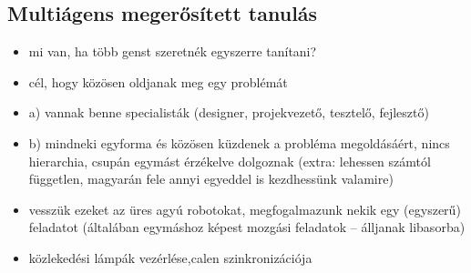 \documentclass[a4paper, 11pt]{article}
\begin{document}
\subsection{Multiágens megerősített tanulás}

\begin{itemize}
	\item mi van, ha több genst szeretnék egyszerre tanítani?
	\item cél, hogy közösen oldjanak meg egy problémát
	\item a) vannak benne specialisták (designer, projekvezető, tesztelő, fejlesztő)
	\item b) mindneki egyforma és közösen küzdenek a probléma megoldásáért, nincs hierarchia, csupán egymást érzékelve dolgoznak (extra: lehessen számtól független, magyarán fele annyi egyeddel is kezdhessünk valamire)
	\item vesszük ezeket az üres agyú robotokat, megfogalmazunk nekik egy (egyszerű) feladatot (általában egymáshoz képest mozgási feladatok -- álljanak libasorba)
	\item közlekedési lámpák vezérlése,calen
	 szinkronizációja	
\end{itemize}
\end{document}
